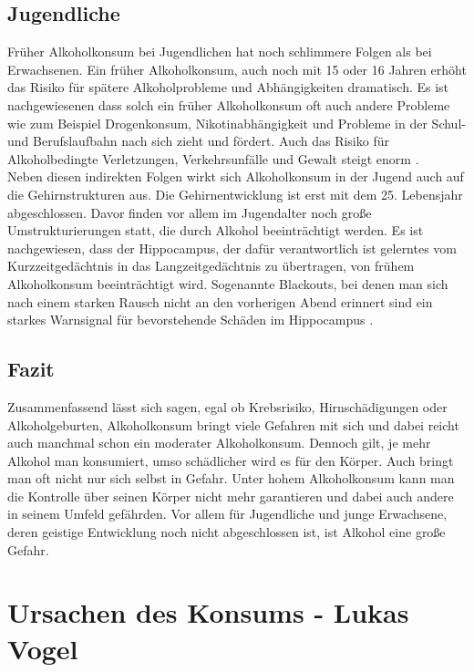 \documentclass[12pt]{article}
\begin{document}
\subsection{Jugendliche}
Früher Alkoholkonsum bei Jugendlichen hat noch schlimmere Folgen als bei Erwachsenen. Ein früher Alkoholkonsum, auch noch mit 15 oder 16 Jahren erhöht das Risiko für spätere Alkoholprobleme und Abhängigkeiten dramatisch. Es ist nachgewiesenen dass solch ein früher Alkoholkonsum oft auch andere Probleme wie zum Beispiel Drogenkonsum, Nikotinabhängigkeit und Probleme in der Schul- und Berufslaufbahn nach sich zieht und fördert. Auch das Risiko für Alkoholbedingte Verletzungen, Verkehrsunfälle und Gewalt steigt enorm \autocite[27]{kuhn_empfehlungen_nodate}. \\
Neben diesen indirekten Folgen wirkt sich Alkoholkonsum in der Jugend auch auf die Gehirnstrukturen aus. Die Gehirnentwicklung ist erst mit dem 25. Lebensjahr abgeschlossen. Davor finden vor allem im Jugendalter noch große Umstrukturierungen statt, die durch Alkohol beeinträchtigt werden. Es ist nachgewiesen, dass der Hippocampus, der dafür verantwortlich ist gelerntes vom Kurzzeitgedächtnis in das Langzeitgedächtnis zu übertragen, von frühem Alkoholkonsum beeinträchtigt wird. Sogenannte Blackouts, bei denen man sich nach einem starken Rausch nicht an den vorherigen Abend erinnert sind ein starkes Warnsignal für bevorstehende Schäden im Hippocampus \autocite{noauthor_topthema_nodate}.
\clearpage
\subsection{Fazit}
Zusammenfassend lässt sich sagen, egal ob Krebsrisiko, Hirnschädigungen oder Alkoholgeburten, Alkoholkonsum bringt viele Gefahren mit sich und dabei reicht auch manchmal schon ein moderater Alkoholkonsum. Dennoch gilt, je mehr Alkohol man konsumiert, umso schädlicher wird es für den Körper. Auch bringt man oft nicht nur sich selbst in Gefahr. Unter hohem Alkoholkonsum kann man die Kontrolle über seinen Körper nicht mehr garantieren und dabei auch andere in seinem Umfeld gefährden. Vor allem für Jugendliche und junge Erwachsene, deren geistige Entwicklung noch nicht abgeschlossen ist, ist Alkohol eine große Gefahr. 
\section{Ursachen des Konsums \footnotesize{- Lukas Vogel}}
\end{document}
